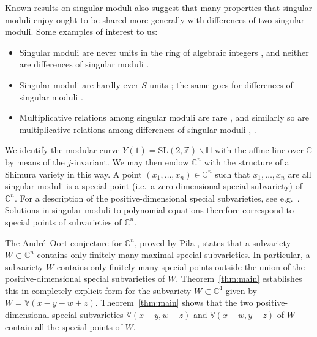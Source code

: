 \documentclass[12pt,a4paper,oneside]{amsart}
\begin{document}
Known results on singular moduli also suggest that many properties that singular moduli enjoy ought to be shared more generally with differences of two singular moduli. Some examples of interest to us:
	\begin{itemize}
	\item Singular moduli are never units in the ring of algebraic integers \cite[Th.~1.1]{BiluHabeggerKuehne20}, and neither are differences of singular moduli \cite[Cor.~1.3]{Li21}.
	\item Singular moduli are hardly ever $S$-units \cite[Cor.~1.1]{Campagna20}; the same goes for differences of singular moduli \cite[Th.~1]{HerreroMenaresRiveraletelier24}.
	\item Multiplicative relations among singular moduli are rare \cite[Th.~1.2]{PilaTsimerman17}, and similarly so are multiplicative relations among differences of singular moduli \cite[Th.~1.5]{AslanyanEterovicFowler23}, \cite[Cor.~1.5]{FuZhao24}.
	\end{itemize}
	
	\medskip
	
	We identify the modular curve $Y(1) = \mathrm{SL}(2, \mathbb{Z}) \backslash \mathbb{H}$ with the affine line over $\mathbb{C}$ by means of the $j$-invariant. We may then endow $\mathbb{C}^n$ with the structure of a Shimura variety in this way. A point $(x_1, \ldots, x_n) \in \mathbb{C}^n$ such that $x_1, \ldots, x_n$ are all singular moduli is a special point (i.e.~a zero-dimensional special subvariety) of $\mathbb{C}^n$. For a description of the positive-dimensional special subvarieties, see e.g.~\cite[Def.~1.3]{Pila11}. Solutions in singular moduli to polynomial equations therefore correspond to special points of subvarieties of $\mathbb{C}^n$.
	
	The Andr\'e--Oort conjecture for $\mathbb{C}^n$, proved by Pila \cite{Pila11}, states that a subvariety $W \subset \mathbb{C}^n$ contains only finitely many maximal special subvarieties. In particular, a subvariety $W$ contains only finitely many special points outside the union of the positive-dimensional special subvarieties of $W$. Theorem~\ref{thm:main} establishes this in completely explicit form for the subvariety $W \subset \mathbb{C}^4$ given by $W = \mathbb{V}(x - y - w + z)$. Theorem~\ref{thm:main} shows that the two positive-dimensional special subvarieties $\mathbb{V}(x - y, w - z)$ and $\mathbb{V}(x - w, y - z)$ of $W$ contain all the special points of $W$.
	
\end{document}
